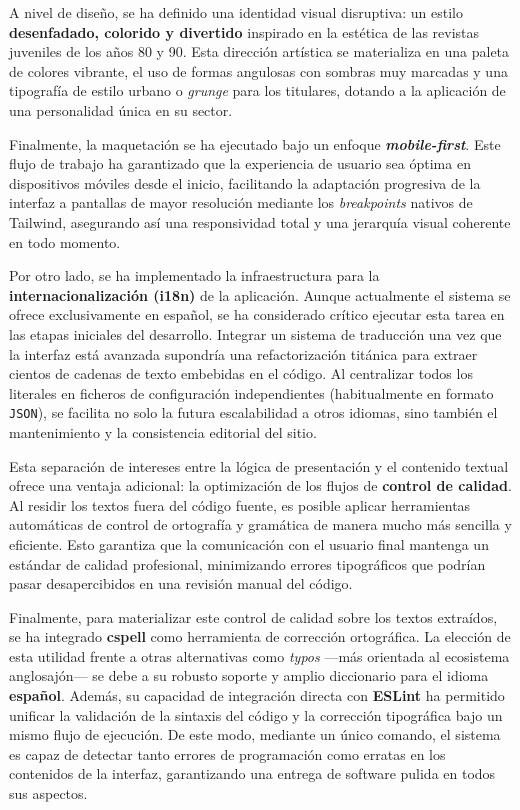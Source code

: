 A nivel de diseño, se ha definido una identidad visual disruptiva: un estilo
\textbf{desenfadado, colorido y divertido} inspirado en la estética de las
revistas juveniles de los años 80 y 90. Esta dirección artística se materializa
en una paleta de colores vibrante, el uso de formas angulosas con sombras muy
marcadas y una tipografía de estilo urbano o \textit{grunge} para los
titulares, dotando a la aplicación de una personalidad única en su sector.

Finalmente, la maquetación se ha ejecutado bajo un enfoque
\textbf{\textit{mobile-first}}. Este flujo de trabajo ha garantizado que la
experiencia de usuario sea óptima en dispositivos móviles desde el inicio,
facilitando la adaptación progresiva de la interfaz a pantallas de mayor
resolución mediante los \textit{breakpoints} nativos de Tailwind, asegurando
así una responsividad total y una jerarquía visual coherente en todo momento.

Por otro lado, se ha implementado la infraestructura para la
\textbf{internacionalización (i18n)} de la aplicación. Aunque actualmente el
sistema se ofrece exclusivamente en español, se ha considerado crítico ejecutar
esta tarea en las etapas iniciales del desarrollo. Integrar un sistema de
traducción una vez que la interfaz está avanzada supondría una refactorización
titánica para extraer cientos de cadenas de texto embebidas en el código. Al
centralizar todos los literales en ficheros de configuración independientes
(habitualmente en formato \texttt{JSON}), se facilita no solo la futura
escalabilidad a otros idiomas, sino también el mantenimiento y la consistencia
editorial del sitio.

Esta separación de intereses entre la lógica de presentación y el contenido
textual ofrece una ventaja adicional: la optimización de los flujos de
\textbf{control de calidad}. Al residir los textos fuera del código fuente, es
posible aplicar herramientas automáticas de control de ortografía y gramática
de manera mucho más sencilla y eficiente. Esto garantiza que la comunicación
con el usuario final mantenga un estándar de calidad profesional, minimizando
errores tipográficos que podrían pasar desapercibidos en una revisión manual
del código.

Finalmente, para materializar este control de calidad sobre los textos
extraídos, se ha integrado \textbf{cspell} como herramienta de corrección
ortográfica. La elección de esta utilidad frente a otras alternativas como
\textit{typos} —más orientada al ecosistema anglosajón— se debe a su robusto
soporte y amplio diccionario para el idioma \textbf{español}. Además, su
capacidad de integración directa con \textbf{ESLint} ha permitido unificar la
validación de la sintaxis del código y la corrección tipográfica bajo un mismo
flujo de ejecución. De este modo, mediante un único comando, el sistema es
capaz de detectar tanto errores de programación como erratas en los contenidos
de la interfaz, garantizando una entrega de software pulida en todos sus
aspectos.

